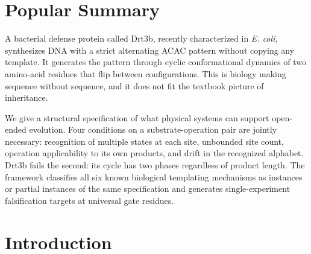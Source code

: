 \documentclass[aps,prx,reprint,amsmath,amssymb,floatfix,superscriptaddress,nofootinbib]{revtex4-2}
\theoremstyle{plain-thm}
\theoremstyle{definition-thm}
\begin{document}
\begin{abstract}
Drt3b Mode 3 by 1.0 bits of channel mutual information against the stated five-channel ensemble. Family-level apparatus application across 1{,}232 Drt3b homologs confirms in-envelope behavior for 33 secondary-residue clades and a 17-fold elevation in dG misincorporation at the A-state for 6 E26$\to$D primary-gate clades, the framework-predicted shift for selectivity-gate degradation. Two distinct universal-gate classes generate single-experiment falsification targets: an architectural gate (R253) whose substitution predicts cycle-architecture collapse, and a selectivity gate (G248) whose substitution predicts intact cycle with shifted product composition.
\end{abstract}

\maketitle

\section*{Popular Summary}

A bacterial defense protein called Drt3b, recently characterized in \emph{E. coli}, synthesizes DNA with a strict alternating ACAC pattern without copying any template. It generates the pattern through cyclic conformational dynamics of two amino-acid residues that flip between configurations. This is biology making sequence without sequence, and it does not fit the textbook picture of inheritance.

We give a structural specification of what physical systems can support open-ended evolution. Four conditions on a substrate-operation pair are jointly necessary: recognition of multiple states at each site, unbounded site count, operation applicability to its own products, and drift in the recognized alphabet. Drt3b fails the second: its cycle has two phases regardless of product length. The framework classifies all six known biological templating mechanisms as instances or partial instances of the same specification and generates single-experiment falsification targets at universal gate residues.


\section{Introduction}
\end{document}

